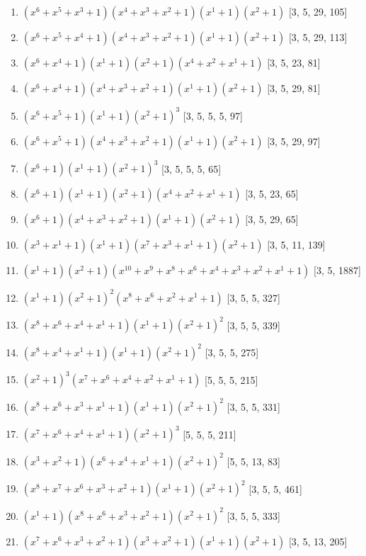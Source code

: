 \documentclass[10pt,twocolumn]{article}
\begin{document}
\begin{enumerate}
\item $(x^{6} + x^{5} + x^{3} + 1)(x^{4} + x^{3} + x^{2} + 1)(x^{1} + 1)(x^{2} + 1)$  [3, 5, 29, 105]
\item $(x^{6} + x^{5} + x^{4} + 1)(x^{4} + x^{3} + x^{2} + 1)(x^{1} + 1)(x^{2} + 1)$  [3, 5, 29, 113]
\item $(x^{6} + x^{4} + 1)(x^{1} + 1)(x^{2} + 1)(x^{4} + x^{2} + x^{1} + 1)$  [3, 5, 23, 81]
\item $(x^{6} + x^{4} + 1)(x^{4} + x^{3} + x^{2} + 1)(x^{1} + 1)(x^{2} + 1)$  [3, 5, 29, 81]
\item $(x^{6} + x^{5} + 1)(x^{1} + 1)(x^{2} + 1)^{3}$  [3, 5, 5, 5, 97]
\item $(x^{6} + x^{5} + 1)(x^{4} + x^{3} + x^{2} + 1)(x^{1} + 1)(x^{2} + 1)$  [3, 5, 29, 97]
\item $(x^{6} + 1)(x^{1} + 1)(x^{2} + 1)^{3}$  [3, 5, 5, 5, 65]
\item $(x^{6} + 1)(x^{1} + 1)(x^{2} + 1)(x^{4} + x^{2} + x^{1} + 1)$  [3, 5, 23, 65]
\item $(x^{6} + 1)(x^{4} + x^{3} + x^{2} + 1)(x^{1} + 1)(x^{2} + 1)$  [3, 5, 29, 65]
\item $(x^{3} + x^{1} + 1)(x^{1} + 1)(x^{7} + x^{3} + x^{1} + 1)(x^{2} + 1)$  [3, 5, 11, 139]
\item $(x^{1} + 1)(x^{2} + 1)(x^{10} + x^{9} + x^{8} + x^{6} + x^{4} + x^{3} + x^{2} + x^{1} + 1)$  [3, 5, 1887]
\item $(x^{1} + 1)(x^{2} + 1)^{2}(x^{8} + x^{6} + x^{2} + x^{1} + 1)$  [3, 5, 5, 327]
\item $(x^{8} + x^{6} + x^{4} + x^{1} + 1)(x^{1} + 1)(x^{2} + 1)^{2}$  [3, 5, 5, 339]
\item $(x^{8} + x^{4} + x^{1} + 1)(x^{1} + 1)(x^{2} + 1)^{2}$  [3, 5, 5, 275]
\item $(x^{2} + 1)^{3}(x^{7} + x^{6} + x^{4} + x^{2} + x^{1} + 1)$  [5, 5, 5, 215]
\item $(x^{8} + x^{6} + x^{3} + x^{1} + 1)(x^{1} + 1)(x^{2} + 1)^{2}$  [3, 5, 5, 331]
\item $(x^{7} + x^{6} + x^{4} + x^{1} + 1)(x^{2} + 1)^{3}$  [5, 5, 5, 211]
\item $(x^{3} + x^{2} + 1)(x^{6} + x^{4} + x^{1} + 1)(x^{2} + 1)^{2}$  [5, 5, 13, 83]
\item $(x^{8} + x^{7} + x^{6} + x^{3} + x^{2} + 1)(x^{1} + 1)(x^{2} + 1)^{2}$  [3, 5, 5, 461]
\item $(x^{1} + 1)(x^{8} + x^{6} + x^{3} + x^{2} + 1)(x^{2} + 1)^{2}$  [3, 5, 5, 333]
\item $(x^{7} + x^{6} + x^{3} + x^{2} + 1)(x^{3} + x^{2} + 1)(x^{1} + 1)(x^{2} + 1)$  [3, 5, 13, 205]

\end{enumerate}
\end{document}
